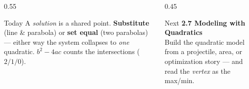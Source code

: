\documentclass[aspectratio=169, 11pt]{beamer}
\begin{document}
\begin{frame}[t, plain]
  \begin{columns}[T]
    \begin{column}{0.55\textwidth}
      \begin{block}{Today}
        A \emph{solution} is a shared point. \textbf{Substitute} (line \& parabola) or \textbf{set equal} (two
        parabolas) --- either way the system collapses to \emph{one} quadratic. $b^2-4ac$ counts the
        intersections ($2/1/0$).
      \end{block}
    \end{column}
    \begin{column}{0.45\textwidth}
      \begin{block}{Next}
        \textbf{2.7 Modeling with Quadratics}
        \\[2pt]
        Build the quadratic model from a projectile, area, or optimization story --- and read the \emph{vertex}
        as the max/min.
      \end{block}
    \end{column}
  \end{columns}
\end{frame}
\end{document}
